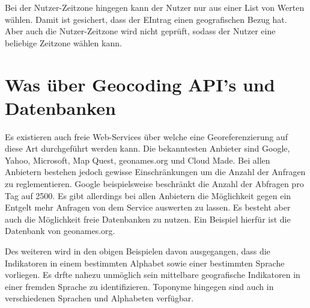 Bei der Nutzer-Zeitzone hingegen kann der Nutzer nur aus einer List von Werten wählen. 
				Damit ist gesichert, dass der EIntrag einen geografischen Bezug hat. 
				Aber auch die Nutzer-Zeitzone wird nicht geprüft, sodass der Nutzer eine beliebige Zeitzone wählen kann. 


\section{Was über Geocoding API's und Datenbanken}


				Es existieren auch freie Web-Services über welche eine Georeferenzierung auf diese Art durchgeführt werden kann. 
				Die bekanntesten Anbieter sind Google, Yahoo, Microsoft, Map Quest, geonames.org und Cloud Made. 
				Bei allen Anbietern bestehen jedoch gewisse Einschränkungen um die Anzahl der Anfragen zu reglementieren.
				Google beispielsweise beschränkt die Anzahl der Abfragen pro Tag auf 2500.
				Es gibt allerdings bei allen Anbietern die Möglichkeit gegen ein Entgelt mehr Anfragen von dem Service auswerten zu lassen.
				Es besteht aber auch die Möglichkeit freie Datenbanken zu nutzen. 
				Ein Beispiel hierfür ist die Datenbank von geonames.org.
				

				
	
Des weiteren wird in den obigen Beispielen davon ausgegangen, dass die Indikatoren in einem bestimmten Alphabet sowie einer bestimmten Sprache vorliegen.
Es drfte nahezu unmöglich sein mittelbare geografische Indikatoren in einer fremden Sprache zu identifizieren.
Toponyme hingegen sind auch in verschiedenen Sprachen und Alphabeten verfügbar. 









	